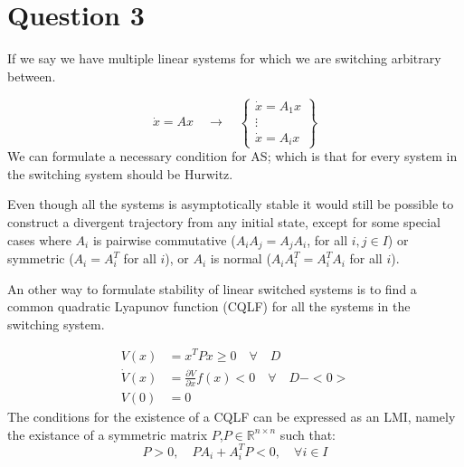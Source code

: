 \chapter{Question 3}
If we say we have multiple linear systems for which we are switching arbitrary between.

\begin{equation}
        \dot{x} = Ax \quad \rightarrow \quad
        \begin{Bmatrix}
                \dot{x} = A_1 x \\
                \vdots \\
                \dot{x} = A_i x
        \end{Bmatrix}
\end{equation}
We can formulate a necessary condition for AS; which is that for every system in the switching system should be Hurwitz.

Even though all the systems is asymptotically stable it would still be possible to construct a divergent trajectory from any initial state, except for some special cases where $A_i$ is pairwise commutative ($A_iA_j = A_j A_i$, for all $i,j \in I$) or symmetric ($A_i = A_i^T$ for all $i$), or $A_i$ is normal ($A_iA_i^T = A_i^T A_i$ for all $i$).

An other way to formulate stability of linear switched systems is to find a common quadratic Lyapunov function (CQLF) for all the systems in the switching system.

\begin{equation}
        \begin{split}
                V(x) &= x^T P x \geq 0 \quad \forall \quad D \\
                \dot{V}(x) &= \frac{\partial V}{\partial x} f(x) < 0 \quad \forall \quad D - <0> \\
                V(0) &= 0
        \end{split}
\end{equation}
The conditions for the existence of a CQLF can be expressed as an LMI, namely the existance of a symmetric matrix $P$,$P \in \mathbb{R}^{n\times n}$ such that:
\begin{equation}
        P > 0, \quad PA_i + A_i^TP < 0, \quad \forall i \in I
\end{equation}
